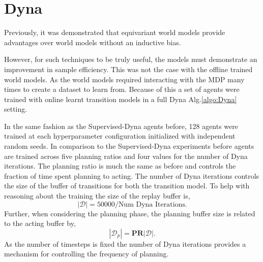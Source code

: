 \section{Dyna}\label{sec:Dyna_experiment}
Previously, it was demonstrated that equivariant world models provide advantages over world models without an inductive bias.

However, for such techniques to be truly useful, the models must demonstrate an improvement in sample efficiency. This was not the case with the offline trained world models. As the world models required interacting with the MDP many times to create a dataset to learn from. Because of this a set of agents were trained with online learnt transition models in a full Dyna Alg.\ref{algo:Dyna} setting.

In the same fashion as the Supervised-Dyna agents before, 128 agents were trained at each hyperparameter configuration initialized with independent random seeds. In comparison to the Supervised-Dyna experiments before agents are trained across five planning ratios and four values for the number of Dyna iterations. The planning ratio is much the same as before and controls the fraction of time spent planning to acting. The number of Dyna iterations controls the size of the buffer of transitions for both the transition model. To help with reasoning about the training the size of the replay buffer is,
\begin{equation}
	|\mathcal{D}| = 50000/\text{Num Dyna Iterations}.
\end{equation}
Further, when considering the planning phase, the planning buffer size is related to the acting buffer by,
\begin{equation}
	|\mathcal{D}_p| = \textbf{PR}|\mathcal{D}|.
\end{equation}
As the number of timesteps is fixed the number of Dyna iterations provides a mechanism for controlling the frequency of planning.

